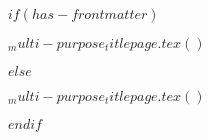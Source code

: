 $if(has-frontmatter)$
  \begin{frontmatter}
    \begin{titlepage}
      $_multi-purpose_titlepage.tex()$
    \end{titlepage}
  \end{frontmatter}
$else$
  \begin{titlepage}
    $_multi-purpose_titlepage.tex()$
  \end{titlepage}
$endif$
